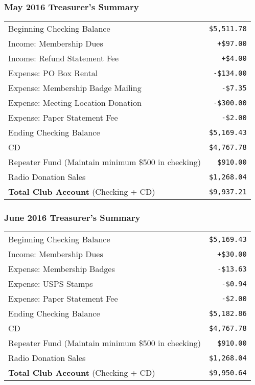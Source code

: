 \documentclass[10pt,letterpaper]{article}
\begin{document}
\subsubsection{May 2016 Treasurer's Summary}
\noindent
\begin{tabular}{|l|r|}
  \hline
  Beginning Checking Balance & \texttt{\$5,511.78} \\
  Income: Membership Dues & \texttt{+\$97.00} \\
  Income: Refund Statement Fee & \texttt{+\$4.00} \\
  Expense: PO Box Rental & \texttt{-\$134.00} \\
  Expense: Membership Badge Mailing & \texttt{-\$7.35} \\
  Expense: Meeting Location Donation & \texttt{-\$300.00} \\
  Expense: Paper Statement Fee & \texttt{-\$2.00} \\
  Ending Checking Balance & \texttt{\$5,169.43} \\
  \hline
  \hline
  CD & \texttt{\$4,767.78} \\
  \hline
  \hline
  Repeater Fund (Maintain minimum \$500 in checking) & \texttt{\$910.00} \\
  \hline
  \hline
  Radio Donation Sales & \texttt{\$1,268.04} \\
  \hline
  \hline
  \textbf{Total Club Account} (Checking + CD) & \texttt{\$9,937.21} \\
  \hline
\end{tabular}

\subsubsection{June 2016 Treasurer's Summary}
\noindent
\begin{tabular}{|l|r|}
  \hline
  Beginning Checking Balance & \texttt{\$5,169.43} \\
  Income: Membership Dues & \texttt{+\$30.00} \\
  Expense: Membership Badges & \texttt{-\$13.63} \\
  Expense: USPS Stamps & \texttt{-\$0.94} \\
  Expense: Paper Statement Fee & \texttt{-\$2.00} \\
  Ending Checking Balance & \texttt{\$5,182.86} \\
  \hline
  \hline
  CD & \texttt{\$4,767.78} \\
  \hline
  \hline
  Repeater Fund (Maintain minimum \$500 in checking) & \texttt{\$910.00} \\
  \hline
  \hline
  Radio Donation Sales & \texttt{\$1,268.04} \\
  \hline
  \hline
  \textbf{Total Club Account} (Checking + CD) & \texttt{\$9,950.64} \\
  \hline
\end{tabular}
\end{document}
